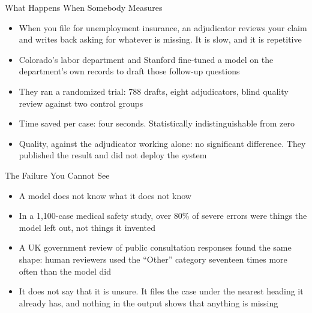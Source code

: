 \documentclass[aspectratio=169]{beamer}
\begin{document}
\begin{frame}{What Happens When Somebody Measures}
    \begin{itemize}\setlength{\itemsep}{6pt}
        \item When you file for unemployment insurance, an adjudicator reviews your claim and
              writes back asking for whatever is missing. It is slow, and it is repetitive
        \item Colorado's labor department and Stanford fine-tuned a model on the department's
              own records to draft those follow-up questions
        \item They ran a randomized trial: 788 drafts, eight adjudicators, blind quality
              review against two control groups
        \item Time saved per case: four seconds. Statistically indistinguishable from zero
        \item Quality, against the adjudicator working alone: no significant difference.
              They published the result and did not deploy the system
    \end{itemize}
\end{frame}

\begin{frame}{The Failure You Cannot See}
    \begin{itemize}\setlength{\itemsep}{7pt}
        \item A model does not know what it does not know
        \item In a 1,100-case medical safety study, over 80\% of severe errors were things
              the model left out, not things it invented
        \item A UK government review of public consultation responses found the same shape:
              human reviewers used the ``Other'' category seventeen times more often than the
              model did
        \item It does not say that it is unsure. It files the case under the nearest heading
              it already has, and nothing in the output shows that anything is missing
    \end{itemize}
\end{frame}
\end{document}
